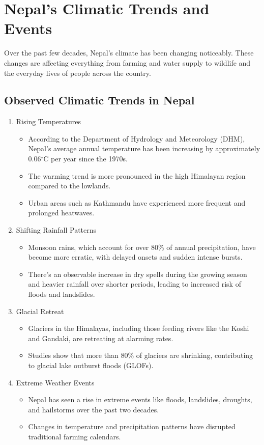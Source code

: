 \section*{Nepal’s Climatic Trends and Events}

Over the past few decades, Nepal’s climate has been changing noticeably. These changes are affecting everything from farming and water supply to wildlife and the everyday lives of people across the country.


\subsection*{Observed Climatic Trends in Nepal}

\begin{enumerate}

\item {Rising Temperatures}
\begin{itemize}
  \item According to the Department of Hydrology and Meteorology (DHM), Nepal’s average annual temperature has been increasing by approximately 0.06$^\circ$C per year since the 1970s. 
  \item The warming trend is more pronounced in the high Himalayan region compared to the lowlands. 
  \item Urban areas such as Kathmandu have experienced more frequent and prolonged heatwaves.
\end{itemize}

\item {Shifting Rainfall Patterns}
\begin{itemize}
  \item Monsoon rains, which account for over 80\% of annual precipitation, have become more erratic, with delayed onsets and sudden intense bursts. 
  \item There’s an observable increase in dry spells during the growing season and heavier rainfall over shorter periods, leading to increased risk of floods and landslides.
\end{itemize}

\item {Glacial Retreat} 
\begin{itemize}
  \item Glaciers in the Himalayas, including those feeding rivers like the Koshi and Gandaki, are retreating at alarming rates. 
  \item Studies show that more than 80\% of glaciers are shrinking, contributing to glacial lake outburst floods (GLOFs).
\end{itemize}

\item {Extreme Weather Events} 
\begin{itemize}
\item Nepal has seen a rise in extreme events like floods, landslides, droughts, and hailstorms over the past two decades. \item Changes in temperature and precipitation patterns have disrupted traditional farming calendars.
\end{itemize}
\end{enumerate}
